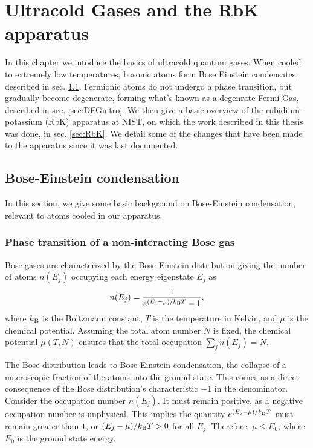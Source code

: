 \renewcommand{\thechapter}{3}

\chapter{Ultracold Gases and the RbK apparatus}\label{chap:Intro}
In this chapter we intoduce the basics of ultracold quantum gases. When cooled to extremely low temperatures, bosonic atoms form Bose Einstein condensates, described in sec. \ref{sec:BECintro}. Fermionic atoms do not undergo a phase transition, but gradually become degenerate, forming what's known as a degenrate Fermi Gas, described in sec. \ref{sec:DFGintro}. We then give a basic overview of the rubidium-potassium (RbK) apparatus at NIST, on which the work described in this thesis was done, in sec. \ref{sec:RbK}. We detail some of the changes that have been made to the apparatus since it was last documented.  

\section{Bose-Einstein condensation}\label{sec:BECintro}
In this section, we give some basic background on Bose-Einstein condensation, relevant to \Rb{} atoms cooled in our apparatus. 

\subsection{Phase transition of a non-interacting Bose gas}
Bose gases are characterized by the Bose-Einstein distribution giving the number of atoms $n(E_j)$ occupying each energy eigenstate $E_j$ as
\begin{equation}
n(E_j) = \frac{1}{e^{(E_j-\mu)/k_{\rm B}T}-1},
\end{equation}
where  $k_{\rm B}$ is the Boltzmann constant, $T$ is the temperature in Kelvin, and $\mu$ is the chemical potential. Assuming the total atom number $N$ is fixed, the chemical potential $\mu(T,N)$ ensures that the total occupation $\sum_j n(E_j)=N$. 

The Bose distribution leads to Bose-Einstein condensation, the collapse of a macroscopic fraction of the atoms into the ground state. This comes as a direct consequence of the Bose distribution's characteristic $-1$ in the denominator. Consider the occupation number $n(E_j)$. It must remain positive, as a negative occupation number is unphysical. This implies the quantity $e^{(E_j-\mu)/k_{\rm B}T}$ must remain greater than $1$, or $(E_j-\mu)/k_{\rm B}T>0$ for all $E_j$. Therefore, $\mu\leq E_0$, where $E_0$ is the ground state energy. 

